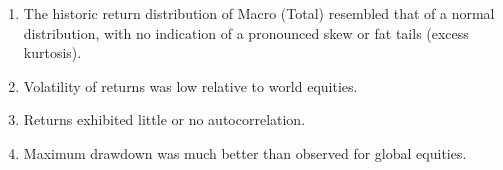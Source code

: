 \documentclass[11pt]{article}
\begin{document}
\begin{enumerate}
  \item The historic return distribution of Macro (Total) resembled that of a normal distribution, with no indication of a pronounced skew or fat tails (excess kurtosis).

  \item Volatility of returns was low relative to world equities.

  \item Returns exhibited little or no autocorrelation.

  \item Maximum drawdown was much better than observed for global equities.

\end{enumerate}
\end{document}
